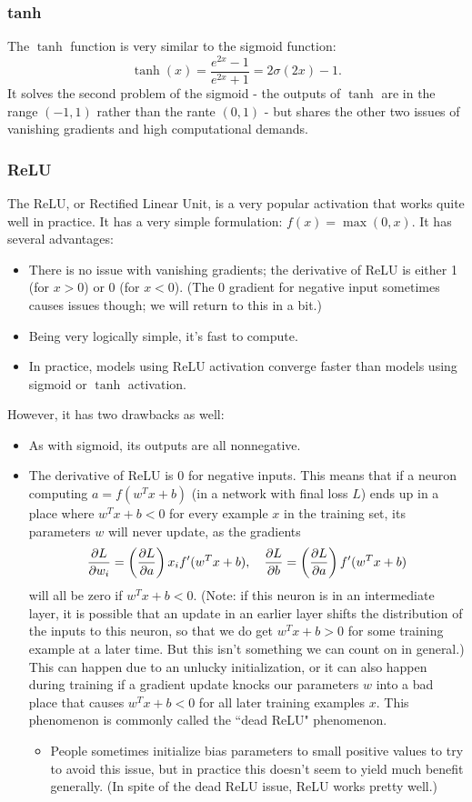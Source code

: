 \subsubsection{tanh}
The $\tanh$ function is very similar to the sigmoid function:
$$\tanh(x) = \frac{e^{2x} - 1}{e^{2x} + 1} = 2\sigma(2x) - 1.$$
It solves the second problem of the sigmoid - the outputs of $\tanh$ are in the range $(-1, 1)$ rather than the rante $(0, 1)$ - but shares the other two issues of vanishing gradients and high computational demands.
\subsubsection{ReLU}
The ReLU, or Rectified Linear Unit, is a very popular activation that works quite well in practice. It has a very simple formulation: $f(x) = \max(0, x)$. It has several advantages:
\begin{itemize}
\item There is no issue with vanishing gradients; the derivative of ReLU is either 1 (for $x > 0$) or 0 (for $x < 0$). (The 0 gradient for negative input sometimes causes issues though; we will return to this in a bit.)
\item Being very logically simple, it's fast to compute.
\item In practice, models using ReLU activation converge faster than models using sigmoid or $\tanh$ activation.
\end{itemize}
However, it has two drawbacks as well:
\begin{itemize}
\item As with sigmoid, its outputs are all nonnegative.
\item The derivative of ReLU is 0 for negative inputs. This means that if a neuron computing $a = f(w^Tx + b)$ (in a network with final loss $L$) ends up in a place where $w^Tx + b < 0$ for every example $x$ in the training set, its parameters $w$ will never update, as the gradients
$$\frac{\partial L}{\partial w_i} = \left(\frac{\partial L}{\partial a}\right) x_i f'(w^Tx + b), \quad \frac{\partial L}{\partial b} = \left(\frac{\partial L}{\partial a}\right) f'(w^Tx + b)$$
will all be zero if $w^Tx + b < 0$. (Note: if this neuron is in an intermediate layer, it is possible that an update in an earlier layer shifts the distribution of the inputs to this neuron, so that we do get $w^Tx + b > 0$ for some training example at a later time. But this isn't something we can count on in general.) This can happen due to an unlucky initialization, or it can also happen during training if a gradient update knocks our parameters $w$ into a bad place that causes $w^Tx + b < 0$ for all later training examples $x$. This phenomenon is commonly called the ``dead ReLU" phenomenon.
\begin{itemize}
\item People sometimes initialize bias parameters to small positive values to try to avoid this issue, but in practice this doesn't seem to yield much benefit generally. (In spite of the dead ReLU issue, ReLU works pretty well.)
\end{itemize}
\end{itemize}
